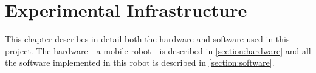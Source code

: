 \chapter{Experimental Infrastructure}

This chapter describes in detail both the hardware and software used in this project. The hardware - a mobile robot - is described in \cref{section:hardware} and all the software implemented in this robot is described in \cref{section:software}.



